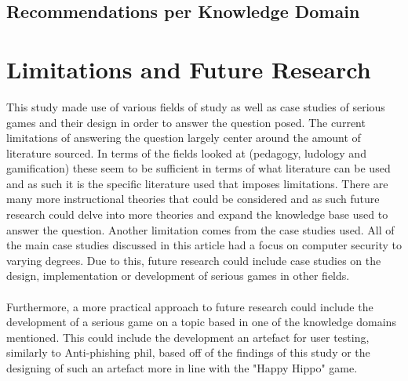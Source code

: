 \documentclass[conference]{IEEEtran}
\begin{document}
\subsection{Recommendations per Knowledge Domain}


\section{Limitations and Future Research}
This study made use of various fields of study as well as case studies of serious games and their design in order to answer the question posed. The current limitations of answering the question largely center around the amount of literature sourced. In terms of the fields looked at (pedagogy, ludology and gamification) these seem to be sufficient in terms of what literature can be used and as such it is the specific literature used that imposes limitations. There are many more instructional theories that could be considered and as such future research could delve into more theories and expand the knowledge base used to answer the question. Another limitation comes from the case studies used. All of the main case studies discussed in this article had a focus on computer security to varying degrees. Due to this, future research could include case studies on the design, implementation or development of serious games in other fields.
\\\\
Furthermore, a more practical approach to future research could include the development of a serious game on a topic based in one of the knowledge domains mentioned. This could include the development an artefact for user testing, similarly to Anti-phishing phil\cite{Sheng2007}, based off of the findings of this study or the designing of such an artefact more in line with the "Happy Hippo" game\cite{allers2021children}.
\end{document}
